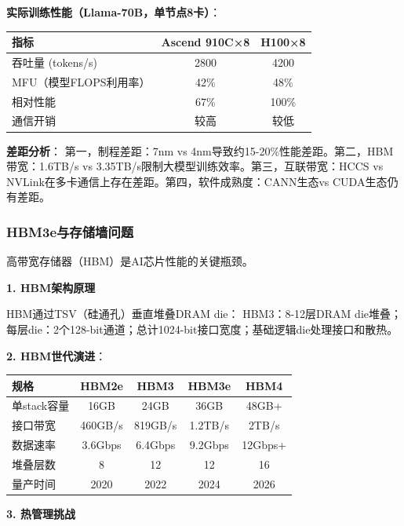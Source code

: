 \textbf{实际训练性能（Llama-70B，单节点8卡）}：

\begin{table}[H]
\centering
\small
\begin{tabular}{lcc}
\toprule
\textbf{指标} & \textbf{Ascend 910C×8} & \textbf{H100×8} \\
\midrule
吞吐量 (tokens/s) & 2800 & 4200 \\
MFU（模型FLOPS利用率） & 42\% & 48\% \\
相对性能 & 67\% & 100\% \\
通信开销 & 较高 & 较低 \\
\bottomrule
\end{tabular}
\end{table}

\textbf{差距分析}：
第一，制程差距：7nm vs 4nm导致约15-20\%性能差距。第二，HBM带宽：1.6TB/s vs 3.35TB/s限制大模型训练效率。第三，互联带宽：HCCS vs NVLink在多卡通信上存在差距。第四，软件成熟度：CANN生态vs CUDA生态仍有差距。

\subsubsection{HBM3e与存储墙问题}

高带宽存储器（HBM）是AI芯片性能的关键瓶颈\cite{SKHynix2024HBM, Samsung2024HBM3e, ISSCC2024HBM}。

\textbf{1. HBM架构原理}

HBM通过TSV（硅通孔）垂直堆叠DRAM die：
HBM3：8-12层DRAM die堆叠；每层die：2个128-bit通道；总计1024-bit接口宽度；基础逻辑die处理接口和散热。

\textbf{2. HBM世代演进}：

\begin{table}[H]
\centering
\small
\begin{tabular}{lcccc}
\toprule
\textbf{规格} & \textbf{HBM2e} & \textbf{HBM3} & \textbf{HBM3e} & \textbf{HBM4} \\
\midrule
单stack容量 & 16GB & 24GB & 36GB & 48GB+ \\
接口带宽 & 460GB/s & 819GB/s & 1.2TB/s & 2TB/s \\
数据速率 & 3.6Gbps & 6.4Gbps & 9.2Gbps & 12Gbps+ \\
堆叠层数 & 8 & 12 & 12 & 16 \\
量产时间 & 2020 & 2022 & 2024 & 2026 \\
\bottomrule
\end{tabular}
\end{table}

\textbf{3. 热管理挑战}


